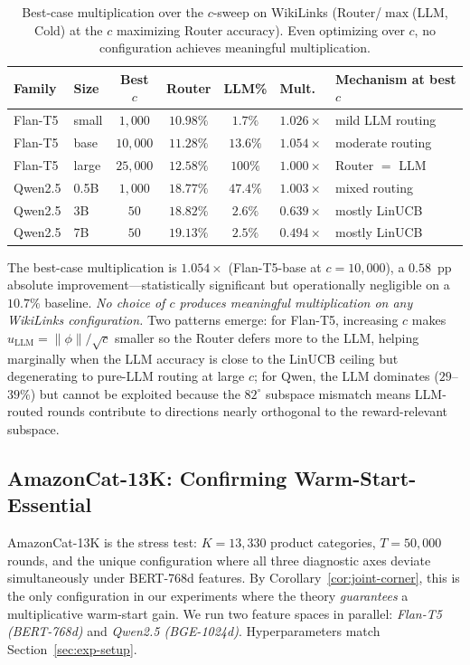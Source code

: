 \documentclass{article}
\theoremstyle{definition}
\theoremstyle{remark}
\theoremstyle{remark}
\begin{document}
\begin{table}[h]
\centering
\caption{Best-case multiplication over the $c$-sweep on WikiLinks
(Router/$\max$(LLM, Cold) at the $c$ maximizing Router accuracy). Even
optimizing over $c$, no configuration achieves meaningful multiplication.}
\label{tab:wiki-csweep}
\small
\begin{tabular}{@{}llccccl@{}}
\toprule
Family & Size & Best $c$ & Router & LLM\% & Mult.\ & Mechanism at best $c$ \\
\midrule
Flan-T5 & small & $1{,}000$ & $10.98\%$ & $1.7\%$ & $1.026\times$ & mild LLM routing \\
Flan-T5 & base  & $10{,}000$ & $11.28\%$ & $13.6\%$ & $1.054\times$ & moderate routing \\
Flan-T5 & large & $25{,}000$ & $12.58\%$ & $100\%$ & $1.000\times$ & Router $=$ LLM \\
\midrule
Qwen2.5 & 0.5B  & $1{,}000$ & $18.77\%$ & $47.4\%$ & $1.003\times$ & mixed routing \\
Qwen2.5 & 3B    & $50$ & $18.82\%$ & $2.6\%$ & $0.639\times$ & mostly LinUCB \\
Qwen2.5 & 7B    & $50$ & $19.13\%$ & $2.5\%$ & $0.494\times$ & mostly LinUCB \\
\bottomrule
\end{tabular}
\end{table}

The best-case multiplication is $1.054\times$ (Flan-T5-base at $c=10{,}000$),
a $0.58$~pp absolute improvement---statistically significant but
operationally negligible on a $10.7\%$ baseline. \emph{No choice of $c$
produces meaningful multiplication on any WikiLinks configuration.} Two
patterns emerge: for Flan-T5, increasing $c$ makes
$u_{\mathrm{LLM}}=\|\phi\|/\sqrt c$ smaller so the Router defers more to
the LLM, helping marginally when the LLM accuracy is close to the LinUCB
ceiling but degenerating to pure-LLM routing at large $c$; for Qwen, the
LLM dominates ($29$--$39\%$) but cannot be exploited because the
$82^\circ$ subspace mismatch means LLM-routed rounds contribute to
directions nearly orthogonal to the reward-relevant subspace.

\subsection{AmazonCat-13K: Confirming Warm-Start-Essential}
\label{sec:amazon}

AmazonCat-13K is the stress test: $K\!=\!13{,}330$ product categories,
$T\!=\!50{,}000$ rounds, and the unique configuration where all three
diagnostic axes deviate simultaneously under BERT-768d features.
By Corollary~\ref{cor:joint-corner}, this is the only configuration in our
experiments where the theory \emph{guarantees} a multiplicative warm-start
gain. We run two feature spaces in parallel: \emph{Flan-T5 (BERT-768d)} and
\emph{Qwen2.5 (BGE-1024d)}. Hyperparameters match
Section~\ref{sec:exp-setup}.
\end{document}
